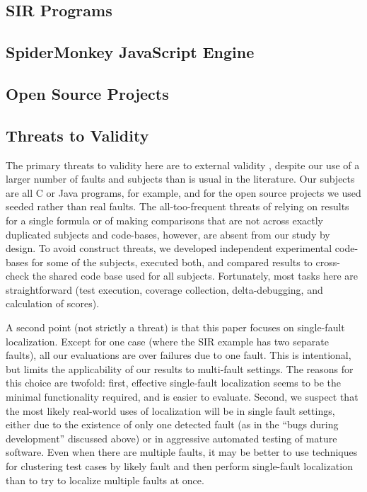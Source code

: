 \subsection{SIR Programs}


\subsection{SpiderMonkey JavaScript Engine}


\subsection{Open Source Projects}
\label{sec:opensource}



\subsection{Threats to Validity}

The primary threats to validity here are to external validity
\cite{Threats}, despite our use of a larger number of faults and
subjects than is usual in the literature.  Our subjects are all C or
Java programs, for example, and for the open source projects we used
seeded rather than real faults.  The all-too-frequent threats
\cite{Threats} of relying on results for a single formula or of making
comparisons that are not across exactly duplicated subjects and
code-bases, however, are absent from our study by design.  To avoid
construct threats, we developed independent experimental code-bases
for some of the subjects, executed both, and compared results to
cross-check the shared code base used for all subjects.  Fortunately,
most tasks here are straightforward (test execution, coverage
collection, delta-debugging, and calculation of scores).

A second point (not strictly a threat) is that this paper focuses on
single-fault localization.  Except for one case (where the SIR example
has two separate faults), all our evaluations are over failures due to
one fault.  This is intentional, but limits the applicability of our
results to multi-fault settings.  The reasons for this choice are
twofold: first, effective single-fault localization seems to be the
minimal functionality required, and is easier to evaluate.  Second, we
suspect that the most likely real-world uses of localization will be
in single fault settings, either due to the existence of only one
detected fault (as in the ``bugs during development'' discussed above)
or in aggressive automated testing of mature software.  Even when
there are multiple faults, it may be better to use techniques for
clustering test cases by likely fault 
\cite{Jones07,PLDI13,Podgurski03,Podgurski04} and then perform
single-fault localization than to try to localize multiple faults at
once.
